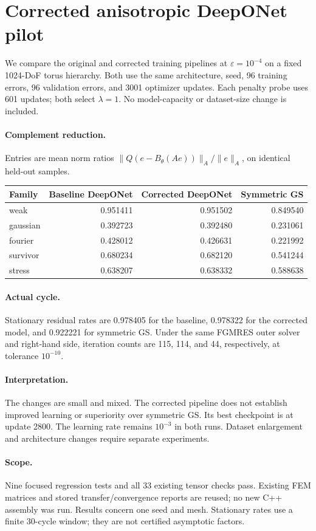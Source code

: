\documentclass{article}
\begin{document}
\section*{Corrected anisotropic DeepONet pilot}
We compare the original and corrected training pipelines at $\varepsilon=10^{-4}$ on a fixed 1024-DoF torus hierarchy. Both use the same architecture, seed, 96 training errors, 96 validation errors, and 3001 optimizer updates. Each penalty probe uses 601 updates; both select $\lambda=1$. No model-capacity or dataset-size change is included.
\paragraph{Complement reduction.} Entries are mean norm ratios $\|Q(e-B_\theta(Ae))\|_A/\|e\|_A$, on identical held-out samples.
\begin{center}\begin{tabular}{lrrr}\toprule
Family & Baseline DeepONet & Corrected DeepONet & Symmetric GS \\ \midrule
weak & 0.951411 & 0.951502 & 0.849540 \\
gaussian & 0.392723 & 0.392480 & 0.231061 \\
fourier & 0.428012 & 0.426631 & 0.221992 \\
survivor & 0.680234 & 0.682120 & 0.541244 \\
stress & 0.638207 & 0.638332 & 0.588638 \\
\bottomrule\end{tabular}\end{center}
\paragraph{Actual cycle.} Stationary residual rates are 0.978405 for the baseline, 0.978322 for the corrected model, and 0.922221 for symmetric GS. Under the same FGMRES outer solver and right-hand side, iteration counts are 115, 114, and 44, respectively, at tolerance $10^{-10}$.
\paragraph{Interpretation.} The changes are small and mixed. The corrected pipeline does not establish improved learning or superiority over symmetric GS. Its best checkpoint is at update 2800. The learning rate remains $10^{-3}$ in both runs. Dataset enlargement and architecture changes require separate experiments.
\paragraph{Scope.} Nine focused regression tests and all 33 existing tensor checks pass. Existing FEM matrices and stored transfer/convergence reports are reused; no new C++ assembly was run. Results concern one seed and mesh. Stationary rates use a finite 30-cycle window; they are not certified asymptotic factors.
\end{document}
